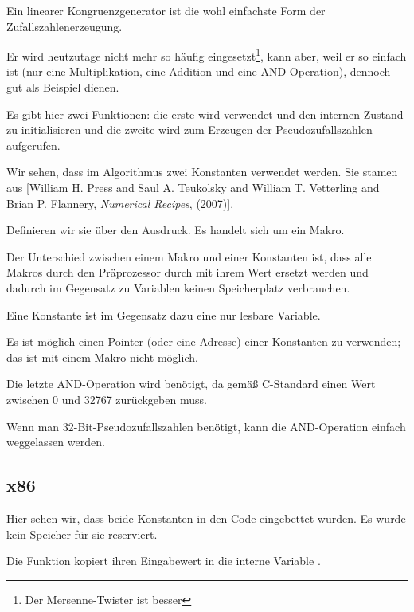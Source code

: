 \label{LCG_simple}
Ein linearer Kongruenzgenerator ist die wohl einfachste Form der Zufallszahlenerzeugung.

Er wird heutzutage nicht mehr so häufig eingesetzt\footnote{Der Mersenne-Twister ist besser}, kann aber, weil er so
einfach ist (nur eine Multiplikation, eine Addition und eine AND-Operation), dennoch gut als Beispiel dienen.


Es gibt hier zwei Funktionen: die erste wird verwendet und den internen Zustand zu initialisieren und die zweite wird
zum Erzeugen der Pseudozufallszahlen aufgerufen.

Wir sehen, dass im Algorithmus zwei Konstanten verwendet werden.
Sie stamen aus [William H. Press and Saul A. Teukolsky and William T. Vetterling and Brian P. Flannery, \emph{Numerical Recipes}, (2007)].

Definieren wir sie über den  \CCpp Ausdruck. Es handelt sich um ein Makro.

Der Unterschied zwischen einem \CCpp Makro und einer Konstanten ist, dass alle Makros durch den \CCpp Präprozessor durch
mit ihrem Wert ersetzt werden und dadurch im Gegensatz zu Variablen keinen Speicherplatz verbrauchen.

Eine Konstante ist im Gegensatz dazu eine nur lesbare Variable.

Es ist möglich einen Pointer (oder eine Adresse) einer Konstanten zu verwenden; das ist mit einem Makro nicht möglich.

Die letzte AND-Operation wird benötigt, da  gemäß C-Standard einen Wert zwischen 0 und 32767 zurückgeben
muss.

Wenn man 32-Bit-Pseudozufallszahlen benötigt, kann die AND-Operation einfach weggelassen werden.

\subsection{x86}


Hier sehen wir, dass beide Konstanten in den Code eingebettet wurden. Es wurde kein Speicher für sie reserviert.

Die Funktion  kopiert ihren Eingabewert in die interne Variable .

